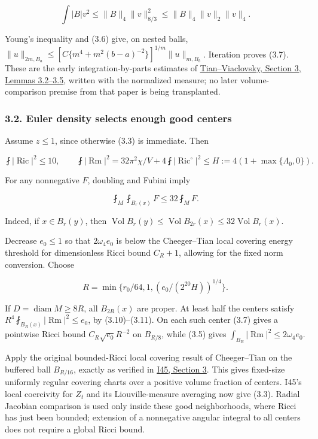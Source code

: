 \documentclass[
  10pt,
]{article}
\begin{document}
\[
 \int|B|v^2\le\|B\|_4\|v\|_{8/3}^2
                   \le\|B\|_4\|v\|_2\|v\|_4.
\]

Young's inequality and (3.6) give, on nested balls,
\(\|u\|_{2m,B_a}\le[C\{m^4+m^2(b-a)^{-2}\}]^{1/m} \|u\|_{m,B_b}\).
Iteration proves (3.7). These are the early integration-by-parts
estimates of \href{https://arxiv.org/pdf/math/0310302}{Tian--Viaclovsky,
Section 3, Lemmas 3.2--3.5}, written with the normalized measure; no
later volume-comparison premise from that paper is being transplanted.

\hypertarget{euler-density-selects-enough-good-centers}{%
\subsubsection{3.2. Euler density selects enough good
centers}\label{euler-density-selects-enough-good-centers}}

Assume \(z\le1\), since otherwise (3.3) is immediate. Then

\[
 \fint|\operatorname{Ric}|^2\le10,\qquad
 \fint|\operatorname{Rm}|^2
       =32\pi^2\chi/V+4\fint|\operatorname{Ric}^{\circ}|^2
       \le H:=4(1+\max\{\Lambda_0,0\}).             \tag{3.10}
\]

For any nonnegative \(F\), doubling and Fubini imply

\[
                     \fint_M\fint_{B_r(x)}F\le32\fint_M F.      \tag{3.11}
\]

Indeed, if \(x\in B_r(y)\), then
\(\operatorname{Vol}B_r(y)\le\operatorname{Vol}B_{2r}(x) \le32\operatorname{Vol}B_r(x)\).

Decrease \(e_0\le1\) so that \(2\omega_4e_0\) is below the Cheeger--Tian
local covering energy threshold for dimensionless Ricci bound \(C_R+1\),
allowing for the fixed norm conversion. Choose

\[
 R=\min\{r_0/64,1,(e_0/(2^{20}H))^{1/4}\}.           \tag{3.12}
\]

If \(D=\operatorname{diam}M\ge8R\), all \(B_{2R}(x)\) are proper. At
least half the centers satisfy
\(R^4\fint_{B_R(x)}|\operatorname{Rm}|^2\le e_0\), by (3.10)--(3.11). On
each such center (3.7) gives a pointwise Ricci bound
\(C_R\sqrt{e_0}R^{-2}\) on \(B_{R/8}\), while (3.5) gives
\(\int_{B_R}|\operatorname{Rm}|^2\le2\omega_4e_0\).

Apply the original bounded-Ricci local covering result of Cheeger--Tian
on the buffered ball \(B_{R/16}\), exactly as verified in
\href{20260927_local_geometry_and_variational_extrema.md}{I45, Section
3}. This gives fixed-size uniformly regular covering charts over a
positive volume fraction of centers. I45's local coercivity for \(Z_t\)
and its Liouville-measure averaging now give (3.3). Radial Jacobian
comparison is used only inside these good neighborhoods, where Ricci has
just been bounded; extension of a nonnegative angular integral to all
centers does not require a global Ricci bound.
\end{document}

